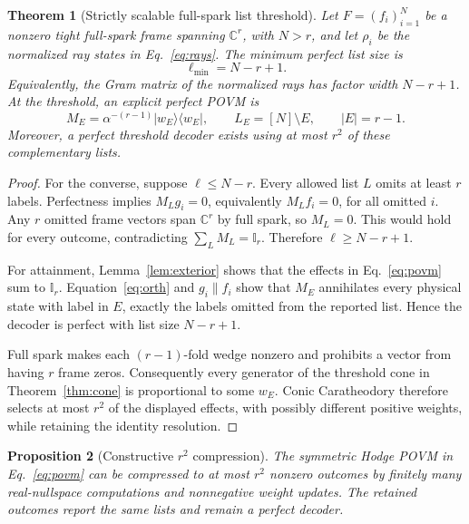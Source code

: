 \documentclass[11pt,a4paper]{article}
\newtheorem{theorem}{Theorem}[section]
\newtheorem{proposition}[theorem]{Proposition}
\newcommand{\C}{\mathbb{C}}
\newcommand{\I}{\mathbb{I}}
\newcommand{\ket}[1]{\lvert #1\rangle}
\newcommand{\bra}[1]{\langle #1\rvert}
\newcommand{\proj}[1]{\ket{#1}\!\bra{#1}}
\begin{document}
\begin{theorem}[Strictly scalable full-spark list threshold]\label{thm:headline}
Let $F=(f_i)_{i=1}^N$ be a nonzero tight full-spark frame spanning $\C^r$,
with $N>r$, and let $\rho_i$ be the normalized ray states in
Eq.~\eqref{eq:rays}.  The minimum perfect list size is
\begin{equation}\label{eq:threshold}
  \ell_{\min}=N-r+1.
\end{equation}
Equivalently, the Gram matrix of the normalized rays has factor width
$N-r+1$.
At the threshold, an explicit perfect POVM is
\begin{equation}\label{eq:povm}
 M_E=\alpha^{-(r-1)}\proj{w_E},\qquad
 L_E=[N]\setminus E,\qquad |E|=r-1.
\end{equation}
Moreover, a perfect threshold decoder exists using at most $r^2$ of these
complementary lists.
\end{theorem}

\begin{proof}
For the converse, suppose $\ell\le N-r$.  Every allowed list $L$ omits at
least $r$ labels.  Perfectness implies $M_Lg_i=0$, equivalently
$M_Lf_i=0$, for all omitted $i$.  Any
$r$ omitted frame vectors span $\C^r$ by full spark, so $M_L=0$.  This would
hold for every outcome, contradicting $\sum_LM_L=\I_r$.  Therefore
$\ell\ge N-r+1$.

For attainment, Lemma~\ref{lem:exterior} shows that the effects in
Eq.~\eqref{eq:povm} sum to $\I_r$.  Equation~\eqref{eq:orth} and
$g_i\parallel f_i$ show that $M_E$ annihilates every physical state with label
in $E$, exactly the labels omitted from the
reported list.  Hence the decoder is perfect with list size $N-r+1$.

Full spark makes each $(r-1)$-fold wedge nonzero and prohibits a vector from
having $r$ frame zeros.  Consequently every generator of the threshold cone
in Theorem~\ref{thm:cone} is proportional to some $w_E$.  Conic Caratheodory
therefore selects at most $r^2$ of the displayed effects, with possibly
different positive weights, while retaining the identity resolution.
\end{proof}

\begin{proposition}[Constructive $r^2$ compression]\label{prop:compression}
The symmetric Hodge POVM in Eq.~\eqref{eq:povm} can be compressed to at most
$r^2$ nonzero outcomes by finitely many real-nullspace computations and
nonnegative weight updates.  The retained outcomes report the same lists and
remain a perfect decoder.
\end{proposition}
\end{document}
